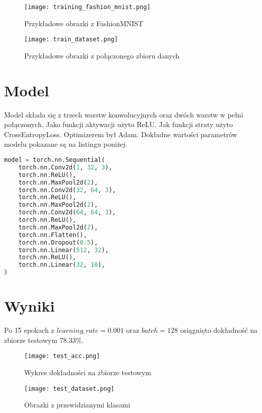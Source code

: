 \documentclass[a4paper]{article}
\begin{document}
\begin{figure}[H]
    \centering
    \texttt{[image: training\_fashion\_mnist.png]}
    \caption{Przykładowe obrazki z FashionMNIST}
    \label{fig:fashion}
\end{figure}

\begin{figure}[H]
    \centering
    \texttt{[image: train\_dataset.png]}
    \caption{Przykładowe obrazki z połączonego zbioru danych}
    \label{fig:dataset}
\end{figure}


\section{Model}

Model składa się z trzech warstw konwolucyjnych oraz dwóch warstw w pełni połączonych.
Jako funkcji aktywacji użyto ReLU. Jak funkcji straty użyto CrossEntropyLoss. Optimizerem
był Adam. Dokładne wartości parametrów modelu pokazane są na listingu poniżej.


\begin{lstlisting}[language=Python]
    model = torch.nn.Sequential(
    torch.nn.Conv2d(1, 32, 3),
    torch.nn.ReLU(),
    torch.nn.MaxPool2d(2),
    torch.nn.Conv2d(32, 64, 3),
    torch.nn.ReLU(),
    torch.nn.MaxPool2d(2),
    torch.nn.Conv2d(64, 64, 3),
    torch.nn.ReLU(),
    torch.nn.MaxPool2d(2),
    torch.nn.Flatten(),
    torch.nn.Dropout(0.5),
    torch.nn.Linear(512, 32),
    torch.nn.ReLU(),
    torch.nn.Linear(32, 10),
)
\end{lstlisting}

\section{Wyniki}

Po 15 epokach z $learning\_rate=0.001$ oraz $batch=128$ osiągnięto dokładność
na zbiorze testowym $78.33\%$.

\begin{figure}[H]
    \centering
    \texttt{[image: test\_acc.png]}
    \caption{Wykres dokładności na zbiorze testowym}
    \label{fig:loss}
\end{figure}

\begin{figure}[H]
    \centering
    \texttt{[image: test\_dataset.png]}
    \caption{Obrazki z przewidzianymi klasami}
    \label{fig:loss}
\end{figure}
\end{document}
